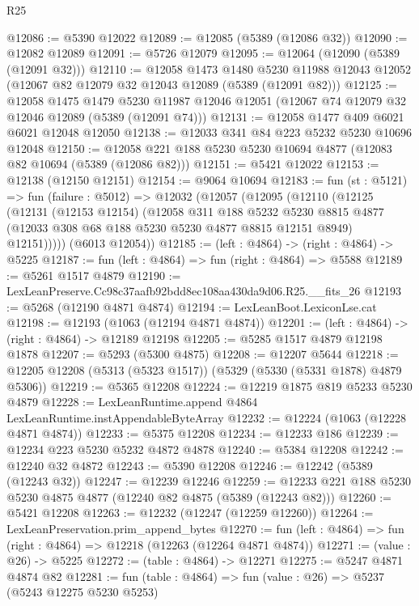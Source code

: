 \begin{lexlean}{R25}
\begin{coremodule}
@12086 := @5390 @12022
@12089 := @12085 (@5389 (@12086 @32))
@12090 := @12082 @12089
@12091 := @5726 @12079
@12095 := @12064 (@12090 (@5389 (@12091 @32)))
@12110 := @12058
    @1473
    @1480
    @5230
    @11988
    @12043
    @12052
    (@12067 @82 @12079 @32 @12043 @12089 (@5389 (@12091 @82)))
@12125 := @12058
    @1475
    @1479
    @5230
    @11987
    @12046
    @12051
    (@12067 @74 @12079 @32 @12046 @12089 (@5389 (@12091 @74)))
@12131 := @12058 @1477 @409 @6021 @6021 @12048 @12050
@12138 := @12033 @341 @84 @223 @5232 @5230 @10696 @12048
@12150 := @12058 @221 @188 @5230 @5230 @10694 @4877 (@12083 @82 @10694 (@5389 (@12086 @82)))
@12151 := @5421 @12022
@12153 := @12138 (@12150 @12151)
@12154 := @9064 @10694
@12183 := fun (st : @5121) =>
  fun (failure : @5012) =>
  @12032
    (@12057
      (@12095
        (@12110
          (@12125
            (@12131
              (@12153 @12154)
              (@12058
                @311
                @188
                @5232
                @5230
                @8815
                @4877
                (@12033 @308 @68 @188 @5230 @5230 @4877 @8815 @12151 @8949)
                @12151)))))
      (@6013 @12054))
@12185 := (left : @4864) -> (right : @4864) -> @5225
@12187 := fun (left : @4864) => fun (right : @4864) => @5588
@12189 := @5261 @1517 @4879
@12190 := LexLeanPreserve.Cc98c37aafb92bdd8ec108aa430da9d06.R25.__fits_26
@12193 := @5268 (@12190 @4871 @4874)
@12194 := LexLeanBoot.LexiconLse.cat
@12198 := @12193 (@1063 (@12194 @4871 @4874))
@12201 := (left : @4864) -> (right : @4864) -> @12189 @12198
@12205 := @5285 @1517 @4879 @12198 @1878
@12207 := @5293 (@5300 @4875)
@12208 := @12207 @5644
@12218 := @12205 @12208 (@5313 (@5323 @1517)) (@5329 (@5330 (@5331 @1878) @4879 @5306))
@12219 := @5365 @12208
@12224 := @12219 @1875 @819 @5233 @5230 @4879
@12228 := LexLeanRuntime.append @4864 LexLeanRuntime.instAppendableByteArray
@12232 := @12224 (@1063 (@12228 @4871 @4874))
@12233 := @5375 @12208
@12234 := @12233 @186
@12239 := @12234 @223 @5230 @5232 @4872 @4878
@12240 := @5384 @12208
@12242 := @12240 @32 @4872
@12243 := @5390 @12208
@12246 := @12242 (@5389 (@12243 @32))
@12247 := @12239 @12246
@12259 := @12233 @221 @188 @5230 @5230 @4875 @4877 (@12240 @82 @4875 (@5389 (@12243 @82)))
@12260 := @5421 @12208
@12263 := @12232 (@12247 (@12259 @12260))
@12264 := LexLeanPreservation.prim_append_bytes
@12270 := fun (left : @4864) => fun (right : @4864) => @12218 (@12263 (@12264 @4871 @4874))
@12271 := (value : @26) -> @5225
@12272 := (table : @4864) -> @12271
@12275 := @5247 @4871 @4874 @82
@12281 := fun (table : @4864) => fun (value : @26) => @5237 (@5243 @12275 @5230 @5253)

\end{coremodule}
\end{lexlean}
